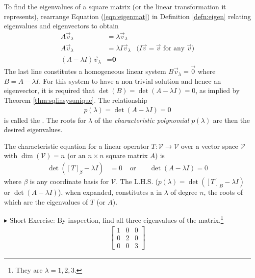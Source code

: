 To find the eigenvalues of a square matrix (or the linear transformation it represents), rearrange Equation (\ref{eqn:eigenmat}) in Definition \ref{defn:eigen} relating eigenvalues and eigenvectors to obtain
\begin{align}
A\vec{v}_\lambda &= \lambda\vec{v}_\lambda \nonumber \\
A\vec{v}_\lambda &= \lambda I\vec{v}_\lambda  &\text{($I\vec{v} = \vec{v}$ for any $\vec{v}$)} \nonumber  \\
(A-\lambda I)\vec{v}_\lambda &= \textbf{0} \label{eqn:eigenminus}
\end{align}
The last line constitutes a homogeneous linear system $B\vec{v}_\lambda = \vec{0}$ where $B = A - \lambda I$. For this system to have a non-trivial solution and hence an eigenvector, it is required that $\det(B) = \det(A - \lambda I) = 0$, as implied by Theorem \ref{thm:sqlinsysunique}. The relationship 
\begin{align}
p(\lambda) = \det(A - \lambda I) = 0    
\end{align}
is called the . The roots for $\lambda$ of the \textit{characteristic polynomial} $p(\lambda)$ are then the desired eigenvalues.
\begin{defn}
\label{defn:charactereqn}
The characteristic equation for a linear operator $T: \mathcal{V} \to \mathcal{V}$ over a vector space $\mathcal{V}$ with $\dim(\mathcal{V}) = n$ (or an $n \times n$ square matrix $A$) is
\begin{align*}
\det([T]_\beta - \lambda I) &= 0 & \text{ or } & & \det(A-\lambda I) = 0
\end{align*}
where $\mathcal{\beta}$ is any coordinate basis for $\mathcal{V}$. The L.H.S. ($p(\lambda) = \det([T]_B - \lambda I)$ or $\det(A-\lambda I)$), when expanded, constitutes a  in $\lambda$ of degree $n$, the roots of which are the eigenvalues of $T$ (or $A$).
\end{defn}
$\blacktriangleright$ Short Exercise: By inspection, find all three eigenvalues of the matrix.\footnote{They are $\lambda = 1,2,3$.}
\begin{align*}
\begin{bmatrix}
1 & 0 & 0 \\
0 & 2 & 0 \\
0 & 0 & 3
\end{bmatrix}
\end{align*}
